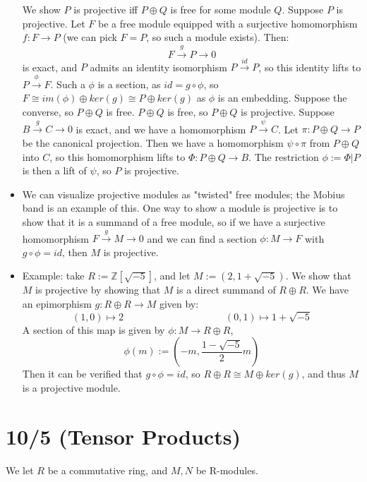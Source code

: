 \documentclass[11pt, oneside]{amsart}   	%
\theoremstyle{definition}
\begin{document}
\begin{itemize}
	We show $P$ is projective iff $P\oplus Q$ is free for some module $Q$. Suppose $P$ is projective. Let $F$ be a free module equipped with a 
	surjective homomorphism $f:F\rightarrow P$ (we can pick $F = P$, so such a module exists). Then:
	$$
		F\xrightarrow{g} P\rightarrow 0
	$$
	is exact, and $P$ admits an identity isomorphism $P\xrightarrow{id} P$, so this identity lifts to $P\xrightarrow{\phi} F$. Such a $\phi$ is a section, as 
	$id = g\circ\phi$, so $F\cong im(\phi)\oplus ker(g)\cong P\oplus ker(g)$ as $\phi$ is an embedding. Suppose the converse, so $P\oplus Q$ is 
	free. $P\oplus Q$ is free, so $P\oplus Q$ is projective. Suppose $B\xrightarrow{g} C\rightarrow 0$ is exact, and we have a homomorphism $P
	\xrightarrow{\psi} C$. Let $\pi : P\oplus Q\rightarrow P$ be the canonical projection. Then we have a homomorphism $\psi\circ\pi$ from $P\oplus Q$ 
	into $C$, so this homomorphism lifts to $\Phi : P\oplus Q\rightarrow B$. The restriction $\phi := \Phi | P$ is then a lift of $\psi$, so $P$ is projective.
	
	\item We can visualize projective modules as "twisted" free modules; the Mobius band is an example of this. One way to show a module is projective 
	is to show that it is a summand of a free module, so if we have a surjective homomorphism $F\xrightarrow{g} M\rightarrow 0$ and we can find a 
	section $\phi : M\rightarrow F$ with $g\circ\phi = id$, then $M$ is projective.
	
	\item Example: take $R := \mathbb Z[\sqrt{-5}]$, and let $M := (2, 1 + \sqrt{-5})$. We show that $M$ is projective by showing that $M$ is a direct 
	summand of $R\oplus R$. We have an epimorphism $g : R\oplus R\rightarrow M$ given by:
	$$
		(1, 0)\mapsto 2\;\;\;\;\;\;\;\;\;\;\;\;\;\;\;\;\;\;\;\;\;\;\;\;\;\;\;\;\;\;\;\;\;\;\;\;\;(0, 1)\mapsto 1 + \sqrt{-5}
	$$
	A section of this map is given by $\phi: M\rightarrow R\oplus R$,
	$$
		\phi(m) := (-m, \frac{1 - \sqrt{-5}}{2}m)
	$$
	Then it can be verified that $g\circ\phi = id$, so $R\oplus R\cong M\oplus ker(g)$, and thus $M$ is a projective module.

\end{itemize}

\section{10/5 (Tensor Products)}

We let $R$ be a commutative ring, and $M, N$ be R-modules.
\end{document}
